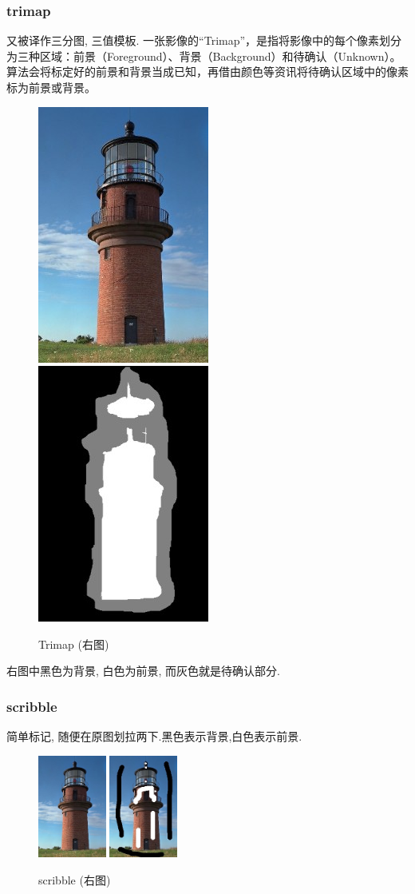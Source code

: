 \documentclass[scheme=chinese,a4paper]{article}
\begin{document}
\subsubsection{trimap} 又被译作三分图, 三值模板\cite{matting}. 一张影像的“Trimap”，是指将影像中的每个像素划分为三种区域：前景（Foreground）、背景（Background）和待确认（Unknown）。算法会将标定好的前景和背景当成已知，再借由颜色等资讯将待确认区域中的像素标为前景或背景。
\begin{figure}[H]
\centering
\includegraphics[width=.2\textwidth]{tower.jpg}
\includegraphics[width=.2\textwidth]{trimap.jpg}
\caption{Trimap (右图)}
\end{figure}
右图中黑色为背景, 白色为前景, 而灰色就是待确认部分. 
\subsubsection{scribble} 简单标记\cite{matting}, 随便在原图划拉两下.黑色表示背景,白色表示前景. 
\begin{figure}[H]
\centering
\includegraphics[width=0.2\textwidth]{tower.jpg}
\includegraphics[width=0.2\textwidth]{scribble.jpg}
\caption{scribble (右图)}
\end{figure}
\end{document}
